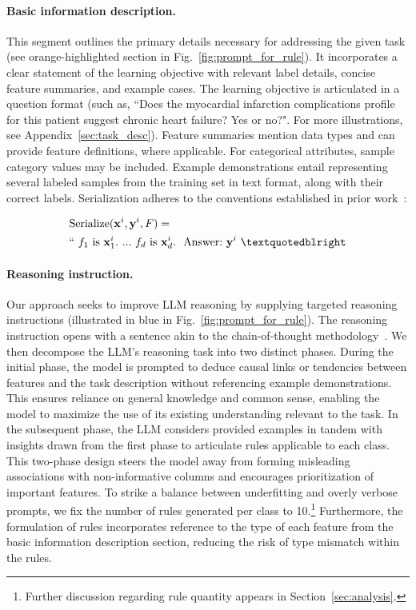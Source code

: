 \vspace*{-0.12in}
\paragraph{Basic information description.} This segment outlines the primary details necessary for addressing the given task (see orange-highlighted section in Fig.~\ref{fig:prompt_for_rule}). It incorporates a clear statement of the learning objective with relevant label details, concise feature summaries, and example cases. The learning objective is articulated in a question format (such as, ``Does the myocardial infarction complications profile for this patient suggest chronic heart failure? Yes or no?". For more illustrations, see Appendix~\ref{sec:task_desc}). Feature summaries mention data types and can provide feature definitions, where applicable. For categorical attributes, sample category values may be included. Example demonstrations entail representing several labeled samples from the training set in text format, along with their correct labels. Serialization adheres to the conventions established in prior work~\cite{dinh2022lift,hegselmann2023tabllm}:

\begin{align}
&\text{Serialize}(\mathbf{x}^i,\mathbf{y}^i, F) = \nonumber \\ 
&``\ f_1\ \text{is}\ \mathbf{x}^i_1.\ ... \ f_d\  \text{is}\  \mathbf{x}^i_d.\ \ \text{Answer:}\  \mathbf{y}^i\ ”
\end{align}

\vspace*{-0.12in}
\paragraph{Reasoning instruction.} Our approach seeks to improve LLM reasoning by supplying targeted reasoning instructions (illustrated in blue in Fig.~\ref{fig:prompt_for_rule}). The reasoning instruction opens with a sentence akin to the chain-of-thought methodology~\cite{wei2022chain}. We then decompose the LLM's reasoning task into two distinct phases. During the initial phase, the model is prompted to deduce causal links or tendencies between features and the task description without referencing example demonstrations. This ensures reliance on general knowledge and common sense, enabling the model to maximize the use of its existing understanding relevant to the task. In the subsequent phase, the LLM considers provided examples in tandem with insights drawn from the first phase to articulate rules applicable to each class. This two-phase design steers the model away from forming misleading associations with non-informative columns and encourages prioritization of important features. To strike a balance between underfitting and overly verbose prompts, we fix the number of rules generated per class to 10.\footnote{Further discussion regarding rule quantity appears in Section~\ref{sec:analysis}.} Furthermore, the formulation of rules incorporates reference to the type of each feature from the basic information description section, reducing the risk of type mismatch within the rules.

